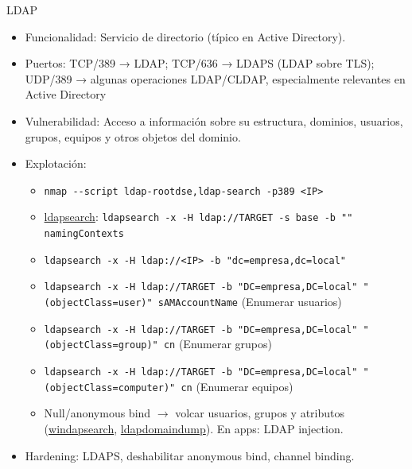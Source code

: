 \documentclass[aspectratio=169,11pt]{beamer}
\newcommand{\cmd}[1]{\texttt{#1}}
\begin{document}
\begin{frame}[allowframebreaks]{LDAP}
\small
  \begin{itemize}
  \item Funcionalidad: Servicio de directorio (típico en Active Directory).
  \item Puertos: TCP/389 → LDAP; TCP/636 → LDAPS (LDAP sobre TLS); UDP/389 → algunas operaciones LDAP/CLDAP, especialmente relevantes en Active Directory
  \item Vulnerabilidad: Acceso a información sobre su estructura, dominios, usuarios, grupos, equipos y otros objetos del dominio.
  \item Explotación:
    \begin{itemize} 
      \item \cmd{nmap -{}-script ldap-rootdse,ldap-search -p389 <IP>}
      \item \href{https://www.openldap.org/software/man.cgi?query=ldapsearch}{ldapsearch}: \cmd{ldapsearch -x -H ldap://TARGET -s base -b "" namingContexts}
      \item \cmd{ldapsearch -x -H ldap://<IP> -b "dc=empresa,dc=local"}
      \item \cmd{ldapsearch -x -H ldap://TARGET -b "DC=empresa,DC=local" "(objectClass=user)" sAMAccountName} (Enumerar usuarios)
      \item \cmd{ldapsearch -x -H ldap://TARGET -b "DC=empresa,DC=local" "(objectClass=group)" cn} (Enumerar grupos)
      \item \cmd{ldapsearch -x -H ldap://TARGET -b "DC=empresa,DC=local" "(objectClass=computer)" cn} (Enumerar equipos)
      \item Null/anonymous bind $\rightarrow$ volcar usuarios, grupos y atributos (\href{https://github.com/ropnop/windapsearch}{windapsearch}, \href{https://github.com/dirkjanm/ldapdomaindump}{ldapdomaindump}). En apps: LDAP injection.
        \end{itemize}
  \item Hardening: LDAPS, deshabilitar anonymous bind, channel binding.
  \end{itemize}
\end{frame}

\end{document}
